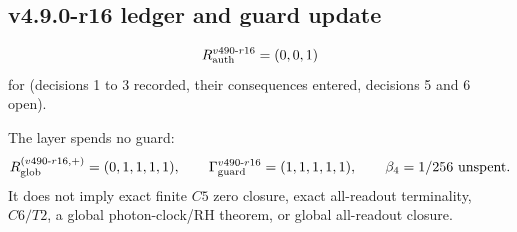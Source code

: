 \subsection*{v4.9.0-r16 ledger and guard update}
\label{subsec:v490-r16-ledger-guard}

\[
R_{\rm auth}^{v490\text{-}r16}=(0,0,1)
\]
for (decisions 1 to 3 recorded, their consequences entered, decisions 5 and 6 open).

The layer spends no guard:
\[
R_{\rm glob}^{(v490\text{-}r16,+)}=(0,1,1,1,1),
\qquad
\Gamma_{\rm guard}^{v490\text{-}r16}=(1,1,1,1,1),
\qquad
\beta_4=1/256\ \text{unspent}.
\]
It does not imply exact finite \(C5\) zero closure, exact all-readout terminality,
\(C6/T2\), a global photon-clock/RH theorem, or global all-readout closure.

